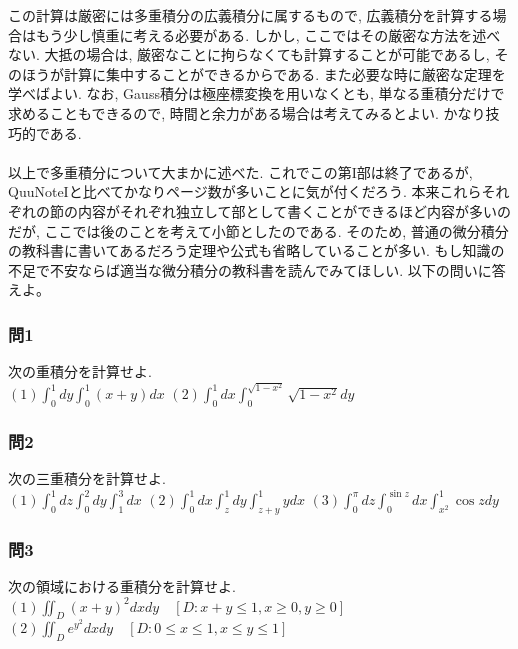         この計算は厳密には多重積分の広義積分に属するもので, 広義積分を計算する場合はもう少し慎重に考える必要がある. しかし, ここではその厳密な方法を述べない. 大抵の場合は, 厳密なことに拘らなくても計算することが可能であるし, 
        そのほうが計算に集中することができるからである. また必要な時に厳密な定理を学べばよい. なお, Gauss積分は極座標変換を用いなくとも, 単なる重積分だけで求めることもできるので, 時間と余力がある場合は考えてみるとよい. かなり技巧的である.\\\\

        以上で多重積分について大まかに述べた. これでこの第I部は終了であるが, QuuNoteIと比べてかなりページ数が多いことに気が付くだろう.
        本来これらそれぞれの節の内容がそれぞれ独立して部として書くことができるほど内容が多いのだが, ここでは後のことを考えて小節としたのである.
        そのため, 普通の微分積分の教科書に書いてあるだろう定理や公式も省略していることが多い. もし知識の不足で不安ならば適当な微分積分の教科書を読んでみてほしい.
        \clearpage
        \basicquestion 以下の問いに答えよ。

        \subsubsection*{問1} 次の重積分を計算せよ.\\
            $(1)\displaystyle \int_{0}^{1}dy\int_{0}^{1}(x+y)dx$\hspace{5mm}
            $(2)\displaystyle \int_{0}^{1}dx\int_{0}^{\sqrt{1-x^2}}\sqrt{1-x^2}dy$

        \subsubsection*{問2} 次の三重積分を計算せよ.\\
            $(1)\displaystyle \int_{0}^{1}dz\int_{0}^{2}dy\int_{1}^{3}dx$\hspace{5mm}
            $(2)\displaystyle \int_{0}^{1}dx\int_{z}^{1}dy\int_{z+y}^{1}ydx$\hspace{5mm}
            $(3)\displaystyle \int_{0}^{\pi}dz\int_{0}^{\sin z}dx\int_{x^2}^{1}\cos zdy$

        \subsubsection*{問3}次の領域における重積分を計算せよ.\\
            $(1)\displaystyle \iint_D (x+y)^2dxdy\quad [D:x+y\leq 1,x\geq0,y\geq0]$\hspace{1mm}
            $(2)\displaystyle \iint_D e^{y^2}dxdy\quad [D:0\leq x\leq 1,x\leq y\leq 1]$

